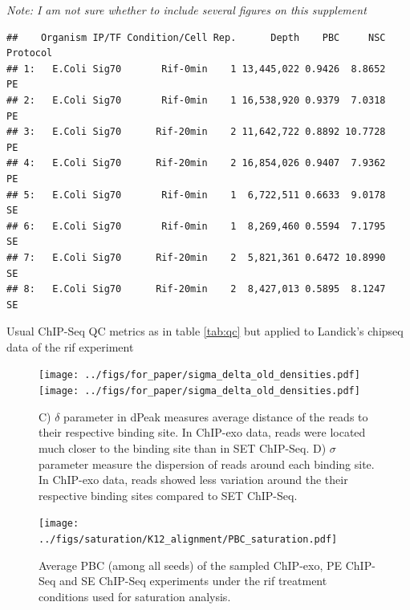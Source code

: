 \documentclass{bmcart}\usepackage[]{graphicx}\usepackage[]{color}
\makeatletter
\newenvironment{kframe}{%
 \def\at@end@of@kframe{}%
 \ifinner\ifhmode%
  \def\at@end@of@kframe{\end{minipage}}%
  \begin{minipage}{\columnwidth}%
 \fi\fi%
 \def\FrameCommand##1{\hskip\@totalleftmargin \hskip-\fboxsep
 \colorbox{shadecolor}{##1}\hskip-\fboxsep
     \hskip-\linewidth \hskip-\@totalleftmargin \hskip\columnwidth}%
 \MakeFramed {\advance\hsize-\width
   \@totalleftmargin\z@ \linewidth\hsize
   \@setminipage}}%
 {\par\unskip\endMakeFramed%
 \at@end@of@kframe}
\newenvironment{knitrout}{}{} %
\makeatother
\begin{document}
\emph{Note: I am not sure whether to include several figures on this supplement}

\begin{table}[h!]
  \centering
\begin{knitrout}
\color{fgcolor}\begin{kframe}
\begin{verbatim}
##    Organism IP/TF Condition/Cell Rep.      Depth    PBC     NSC Protocol
## 1:   E.Coli Sig70       Rif-0min    1 13,445,022 0.9426  8.8652       PE
## 2:   E.Coli Sig70       Rif-0min    1 16,538,920 0.9379  7.0318       PE
## 3:   E.Coli Sig70      Rif-20min    2 11,642,722 0.8892 10.7728       PE
## 4:   E.Coli Sig70      Rif-20min    2 16,854,026 0.9407  7.9362       PE
## 5:   E.Coli Sig70       Rif-0min    1  6,722,511 0.6633  9.0178       SE
## 6:   E.Coli Sig70       Rif-0min    1  8,269,460 0.5594  7.1795       SE
## 7:   E.Coli Sig70      Rif-20min    2  5,821,361 0.6472 10.8990       SE
## 8:   E.Coli Sig70      Rif-20min    2  8,427,013 0.5895  8.1247       SE
\end{verbatim}
\end{kframe}
\end{knitrout}
\caption{Usual ChIP-Seq QC metrics as in table \ref{tab:qc} but
  applied to Landick's chipseq data of the rif experiment}
\end{table}

\begin{figure}[h!]
  \centering %
   \texttt{[image: ../figs/for\_paper/sigma\_delta\_old\_densities.pdf]}
   \texttt{[image: ../figs/for\_paper/sigma\_delta\_old\_densities.pdf]}   
  \caption{ C) $\delta$ parameter in dPeak measures average distance
    of the reads to their respective binding site. In ChIP-exo data,
    reads were located much closer to the binding site than in SET
    ChIP-Seq. D) $\sigma$ parameter measure the dispersion of reads
    around each binding site. In ChIP-exo data, reads showed less
    variation around the their respective binding sites compared to
    SET ChIP-Seq.}

\end{figure}

\newpage

\begin{figure}[h!]
  \centering
  \texttt{[image: ../figs/saturation/K12\_alignment/PBC\_saturation.pdf]}
  \caption{Average PBC (among all seeds) of the sampled ChIP-exo, PE
    ChIP-Seq and SE ChIP-Seq experiments under the rif treatment
    conditions used for saturation analysis.}
  \label{fig:pbc_saturation}
\end{figure}
\end{document}
